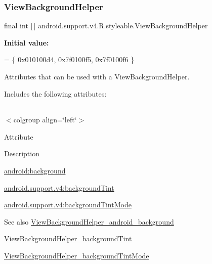 \subsubsection{\texorpdfstring{View\+Background\+Helper}{ViewBackgroundHelper}}
{\footnotesize\ttfamily final int \mbox{[}$\,$\mbox{]} android.\+support.\+v4.\+R.\+styleable.\+View\+Background\+Helper\hspace{0.3cm}{\ttfamily [static]}}

{\bfseries Initial value\+:}
\begin{DoxyCode}
= \{
            0x010100d4, 0x7f0100f5, 0x7f0100f6
        \}
\end{DoxyCode}
Attributes that can be used with a View\+Background\+Helper. 

Includes the following attributes\+:

\tabulinesep=1mm
\begin{longtabu} spread 0pt [c]{*{0}{|X[-1]}|}
\hline
\end{longtabu}
$<$colgroup align=\char`\"{}left\char`\"{}$>$ 

Attribute

Description 

{\ttfamily \hyperlink{classandroid_1_1support_1_1v4_1_1R_1_1styleable_a6ad01bddeaa9cf74d6c553c92ea9c93a}{android\+:background}}

{\ttfamily \hyperlink{classandroid_1_1support_1_1v4_1_1R_1_1styleable_a27d86c38662cdce2ce4f892520e28b4c}{android.\+support.\+v4\+:background\+Tint}}

{\ttfamily \hyperlink{classandroid_1_1support_1_1v4_1_1R_1_1styleable_a3f0822323295c7efedb70efaaefe60dc}{android.\+support.\+v4\+:background\+Tint\+Mode}}

\begin{DoxySeeAlso}{See also}
\hyperlink{classandroid_1_1support_1_1v4_1_1R_1_1styleable_a6ad01bddeaa9cf74d6c553c92ea9c93a}{View\+Background\+Helper\+\_\+android\+\_\+background} 

\hyperlink{classandroid_1_1support_1_1v4_1_1R_1_1styleable_a27d86c38662cdce2ce4f892520e28b4c}{View\+Background\+Helper\+\_\+background\+Tint} 

\hyperlink{classandroid_1_1support_1_1v4_1_1R_1_1styleable_a3f0822323295c7efedb70efaaefe60dc}{View\+Background\+Helper\+\_\+background\+Tint\+Mode} 
\end{DoxySeeAlso}
\mbox{\label{classandroid_1_1support_1_1v4_1_1R_1_1styleable_a6ad01bddeaa9cf74d6c553c92ea9c93a}} 
